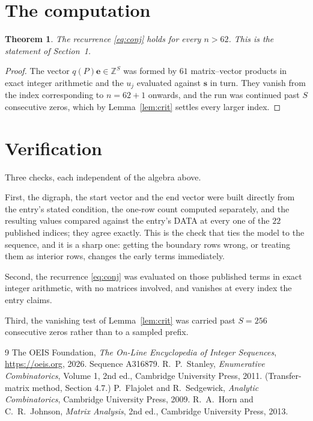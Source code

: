 \documentclass[11pt,a4paper]{article}
\theoremstyle{plain}
\newtheorem{theorem}{Theorem}
\theoremstyle{definition}
\begin{document}
\section{The computation}

\begin{theorem}
The recurrence \eqref{eq:conj} holds for every $n>62$. This is the statement of
Section~1.
\end{theorem}

\begin{proof}
The vector $q(P)\mathbf{e}\in\mathbb{Z}^{S}$ was formed by $61$ matrix--vector
products in exact integer arithmetic and the $u_j$ evaluated against $\mathbf{s}$ in turn.
They vanish from the index corresponding to $n=62+1$ onwards, and the run was continued
past $S$ consecutive zeros, which by Lemma~\ref{lem:crit} settles every larger index.
\end{proof}

\section{Verification}

Three checks, each independent of the algebra above.

First, the digraph, the start vector and the end vector were built directly from the
entry's stated condition, the one-row count computed separately, and the resulting values
compared against the entry's DATA at every one of the $22$ published indices; they
agree exactly. This is the check that ties the model to the sequence, and it is a sharp one:
getting the boundary rows wrong, or treating them as interior rows, changes the early terms
immediately.

Second, the recurrence \eqref{eq:conj} was evaluated on those published terms in exact
integer arithmetic, with no matrices involved, and vanishes at every index the entry claims.

Third, the vanishing test of Lemma~\ref{lem:crit} was carried past $S=256$ consecutive
zeros rather than to a sampled prefix.

\begin{thebibliography}{9}
 The OEIS Foundation, \emph{The On-Line Encyclopedia of Integer
Sequences}, \url{https://oeis.org}, 2026. Sequence A316879.
 R.~P.~Stanley, \emph{Enumerative Combinatorics}, Volume 1, 2nd ed.,
Cambridge University Press, 2011. (Transfer-matrix method, Section 4.7.)
 P.~Flajolet and R.~Sedgewick, \emph{Analytic Combinatorics}, Cambridge
University Press, 2009.
 R.~A.~Horn and C.~R.~Johnson, \emph{Matrix Analysis}, 2nd ed., Cambridge
University Press, 2013.
\end{thebibliography}
\end{document}
